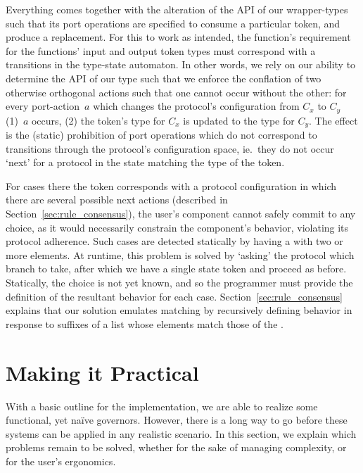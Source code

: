 Everything comes together with the alteration of the API of our wrapper-types such that its port operations are specified to consume a particular token, and produce a replacement. For this to work as intended, the function's requirement for the functions' input and output token types must correspond with a transitions in the type-state automaton. In other words, we rely on our ability to determine the API of our  type such that we enforce the conflation of two otherwise orthogonal actions such that one cannot occur without the other: for every port-action~$a$ which changes the protocol's configuration from $C_x$ to $C_y$ (1)~$a$ occurs, (2) the token's type for $C_x$ is updated to the type for $C_y$. The effect is the (static) prohibition of port operations which do not correspond to transitions through the protocol's configuration space, ie.\ they do not occur `next' for a protocol in the state matching the type of the token. 

For cases there the token corresponds with a protocol configuration in which there are several possible next actions (described in Section~\ref{sec:rule_consensus}), the user's component cannot safely commit to any choice, as it would necessarily constrain the component's behavior, violating its protocol adherence. Such cases are detected statically by having a  with two or more elements. At runtime, this problem is solved by `asking' the protocol which branch to take, after which we have a single state token and proceed as before. Statically, the choice is not yet known, and so the programmer must provide the definition of the resultant behavior for each case. Section~\ref{sec:rule_consensus} explains that our solution emulates matching by recursively defining behavior in response to suffixes of a list whose elements match those of the .

\section{Making it Practical}
\label{sec:making_it_practical}
With a basic outline for the implementation, we are able to realize some functional, yet na\"ive governors. However, there is a long way to go before these systems can be applied in any realistic scenario. In this section, we explain which problems remain to be solved, whether for the sake of managing complexity, or for the user's ergonomics.

